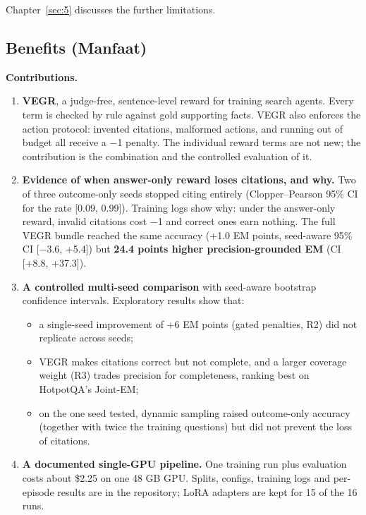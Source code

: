 Chapter~\ref{sec:5} discusses the further limitations.

\subsection{Benefits (Manfaat)}\label{sec:1.5}

\textbf{Contributions.}

\begin{enumerate}
\def\labelenumi{\arabic{enumi}.}
\tightlist
\item
  \textbf{VEGR}, a judge-free, sentence-level reward for training search
  agents. Every term is checked by rule against gold supporting facts.
  VEGR also enforces the action protocol: invented citations, malformed
  actions, and running out of budget all receive a −1 penalty. The
  individual reward terms are not new; the contribution is the
  combination and the controlled evaluation of it.
\item
  \textbf{Evidence of when answer-only reward loses citations, and why.}
  Two of three outcome-only seeds stopped citing entirely
  (Clopper--Pearson 95\% CI for the rate {[}0.09, 0.99{]}). Training
  logs show why: under the answer-only reward, invalid citations cost −1
  and correct ones earn nothing. The full VEGR bundle reached the same
  accuracy (+1.0 EM points, seed-aware 95\% CI {[}−3.6, +5.4{]}) but
  \textbf{24.4 points higher precision-grounded EM} (CI {[}+8.8,
  +37.3{]}).
\item
  \textbf{A controlled multi-seed comparison} with seed-aware bootstrap
  confidence intervals. Exploratory results show that:

  \begin{itemize}
  \tightlist
  \item
    a single-seed improvement of +6 EM points (gated penalties, R2) did
    not replicate across seeds;
  \item
    VEGR makes citations correct but not complete, and a larger coverage
    weight (R3) trades precision for completeness, ranking best on
    HotpotQA's Joint-EM;
  \item
    on the one seed tested, dynamic sampling raised outcome-only
    accuracy (together with twice the training questions) but did not
    prevent the loss of citations.
  \end{itemize}
\item
  \textbf{A documented single-GPU pipeline.} One training run plus
  evaluation costs about \$2.25 on one 48 GB GPU. Splits, configs,
  training logs and per-episode results are in the repository; LoRA
  adapters are kept for 15 of the 16 runs.
\end{enumerate}

